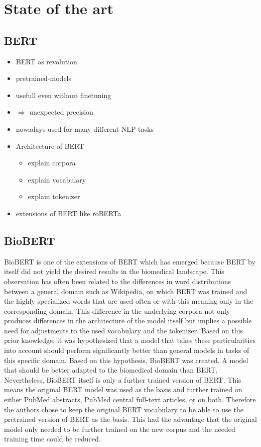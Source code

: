 \chapter{State of the art}
\section{BERT}
\color{ForestGreen}
\begin{itemize}
	\item BERT as revolution
	\item pretrained-models
	\item usefull even without finetuning
	\item $\Rightarrow$ unexpected precision
	\item nowadays used for many different NLP tasks
	\item Architecture of BERT
	\begin{itemize}
		\item explain corpora
		\item explain vocabulary
		\item explain tokenizer
	\end{itemize}
	\item extensions of BERT like roBERTa
\end{itemize}
\color{black}
\section{BioBERT}
BioBERT is one of the extensions of BERT which has emerged because BERT by itself did not yield the desired results in the biomedical landscape. This observation has often been related to the differences in word distributions between a general domain such as Wikipedia, on which BERT was trained and the highly specialized words that are used often or with this meaning only in the corresponding domain. This difference in the underlying corpora not only produces differences in the architecture of the model itself but implies a possible need for adjustments to the used vocabulary and the tokenizer. \cite{Lee2019} 
\newline
Based on this prior knowledge, it was hypothesized that a model that takes these particularities into account should perform significantly better than general models in tasks of this specific domain. Based on this hypothesis, BioBERT was created. A model that should be better adapted to the biomedical domain than BERT.
\newline
Nevertheless, BioBERT itself is only a further trained version of BERT. This means the original BERT model was used as the basis and further trained on either PubMed abstracts, PubMed central full-text articles, or on both. Therefore the authors chose to keep the original BERT vocabulary to be able to use the pretrained version of BERT as the basis. This had the advantage that the original model only needed to be further trained on the new corpus and the needed training time could be reduced.

